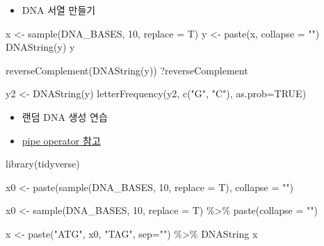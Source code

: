 \documentclass[
]{book}
\newenvironment{Shaded}{\begin{snugshade}}{\end{snugshade}}
\newcommand{\AttributeTok}[1]{\textcolor[rgb]{0.77,0.63,0.00}{#1}}
\newcommand{\ConstantTok}[1]{\textcolor[rgb]{0.00,0.00,0.00}{#1}}
\newcommand{\DecValTok}[1]{\textcolor[rgb]{0.00,0.00,0.81}{#1}}
\newcommand{\FunctionTok}[1]{\textcolor[rgb]{0.00,0.00,0.00}{#1}}
\newcommand{\NormalTok}[1]{#1}
\newcommand{\OtherTok}[1]{\textcolor[rgb]{0.56,0.35,0.01}{#1}}
\newcommand{\SpecialCharTok}[1]{\textcolor[rgb]{0.00,0.00,0.00}{#1}}
\newcommand{\StringTok}[1]{\textcolor[rgb]{0.31,0.60,0.02}{#1}}
\providecommand{\tightlist}{%
  \setlength{\itemsep}{0pt}\setlength{\parskip}{0pt}}
\begin{document}
\begin{itemize}
\tightlist
\item
  DNA 서열 만들기
\end{itemize}

\begin{Shaded}
\begin{Highlighting}[]

\NormalTok{x }\OtherTok{\textless{}{-}} \FunctionTok{sample}\NormalTok{(DNA\_BASES, }\DecValTok{10}\NormalTok{, }\AttributeTok{replace =}\NormalTok{ T)}
\NormalTok{y }\OtherTok{\textless{}{-}} \FunctionTok{paste}\NormalTok{(x, }\AttributeTok{collapse =} \StringTok{""}\NormalTok{)}
\FunctionTok{DNAString}\NormalTok{(y)}
\NormalTok{y}

\FunctionTok{reverseComplement}\NormalTok{(}\FunctionTok{DNAString}\NormalTok{(y))}
\NormalTok{?reverseComplement}

\NormalTok{y2 }\OtherTok{\textless{}{-}} \FunctionTok{DNAString}\NormalTok{(y)}
\FunctionTok{letterFrequency}\NormalTok{(y2, }\FunctionTok{c}\NormalTok{(}\StringTok{"G"}\NormalTok{, }\StringTok{"C"}\NormalTok{), }\AttributeTok{as.prob=}\ConstantTok{TRUE}\NormalTok{)}
\end{Highlighting}
\end{Shaded}

\begin{itemize}
\tightlist
\item
  랜덤 DNA 생성 연습
\item
  \href{https://greendaygh.github.io/kribbr2022/tidyverse.html\#pipe-operator}{pipe operator 참고}
\end{itemize}

\begin{Shaded}
\begin{Highlighting}[]
\FunctionTok{library}\NormalTok{(tidyverse)}

\NormalTok{x0 }\OtherTok{\textless{}{-}} \FunctionTok{paste}\NormalTok{(}\FunctionTok{sample}\NormalTok{(DNA\_BASES, }\DecValTok{10}\NormalTok{, }\AttributeTok{replace =}\NormalTok{ T), }\AttributeTok{collapse =} \StringTok{""}\NormalTok{)}

\NormalTok{x0 }\OtherTok{\textless{}{-}} \FunctionTok{sample}\NormalTok{(DNA\_BASES, }\DecValTok{10}\NormalTok{, }\AttributeTok{replace =}\NormalTok{ T) }\SpecialCharTok{\%\textgreater{}\%}
        \FunctionTok{paste}\NormalTok{(}\AttributeTok{collapse =} \StringTok{""}\NormalTok{)}

\NormalTok{x }\OtherTok{\textless{}{-}} \FunctionTok{paste}\NormalTok{(}\StringTok{"ATG"}\NormalTok{, x0, }\StringTok{"TAG"}\NormalTok{, }\AttributeTok{sep=}\StringTok{""}\NormalTok{) }\SpecialCharTok{\%\textgreater{}\%} 
\NormalTok{      DNAString}
\NormalTok{x}
\end{Highlighting}
\end{Shaded}
\end{document}
